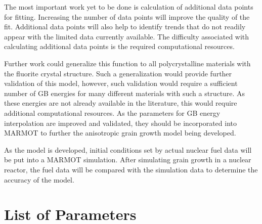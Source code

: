 \documentclass[twoside,senior]{BYUPhys}
\begin{document}
The most important work yet to be done is calculation of additional data points for fitting.  Increasing the number of data points will improve the quality of the fit.  Additional data points will also help to identify trends that do not readily appear with the limited data currently available.  The difficulty associated with calculating additional data points is the required computational resources.  %

Further work could generalize this function to all polycrystalline materials with the fluorite crystal structure.  Such a generalization would provide further validation of this model, however, such validation would require a sufficient number of GB energies for many different materials with such a structure.  As these energies are not already available in the literature, this would require additional computational resources.  As the parameters for GB energy interpolation are improved and validated, they should be incorporated into MARMOT to further the anisotropic grain growth model being developed.

As the model is developed, initial conditions set by actual nuclear fuel data will be put into a MARMOT simulation.  After simulating grain growth in a nuclear reactor, the fuel data will be compared with the simulation data to determine the accuracy of the model.

\appendix
\renewcommand\chaptername{Appendix}

 \cleardoublepage
 

\chapter{List of Parameters\label{app:params}}
\end{document}
